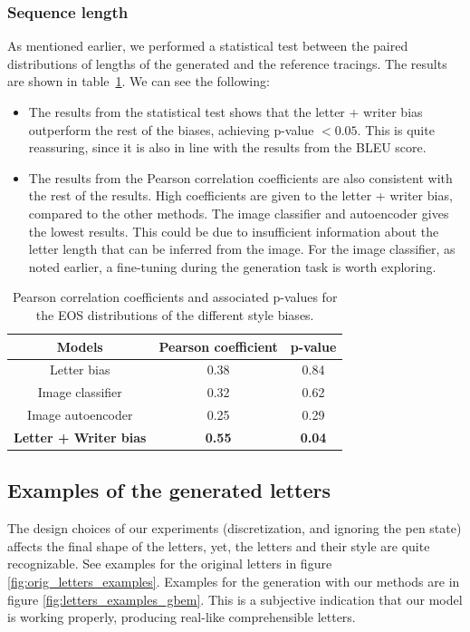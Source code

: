 \subsubsection{Sequence length}
\par As mentioned earlier, we performed a statistical test between the paired distributions of lengths of the generated and the reference tracings. The results are shown in table~\ref{table:2}. We can see the following:
\begin{itemize}
    \item The results from the statistical test shows that the letter + writer bias outperform the rest of the biases, achieving p-value $< 0.05$. This is quite reassuring, since it is also in line with the results from the BLEU score.
    \item The results from the Pearson correlation coefficients are also consistent with the rest of the results. High coefficients are given to the letter + writer bias, compared to the other methods. The image classifier and autoencoder gives the lowest results. This could be due to insufficient information about the letter length that can be inferred from the image. For the image classifier, as noted earlier, a fine-tuning during the generation task is worth exploring.
\end{itemize}

\begin{table}[!htbp]
\centering
\begin{tabular}{|c|c|c|}
\hline
Models & Pearson coefficient & p-value \\ \hline
Letter bias & 0.38 & 0.84 \\ \hline
Image classifier & 0.32 & 0.62\\ \hline
Image autoencoder & 0.25 & 0.29 \\ \hline
\textbf{Letter + Writer bias} & \textbf{0.55} & \textbf{0.04}\\ \hline
\end{tabular}
\caption{Pearson correlation coefficients and associated p-values for the EOS distributions of the different style biases.}

\label{table:2}
\end{table}

\subsection{Examples of the generated letters}
\par The design choices of our experiments (discretization, and ignoring the pen state) affects the final shape of the letters, yet, the letters and their style are quite recognizable. See examples for the original letters in figure \ref{fig:orig_letters_examples}. Examples for the generation with our methods are in figure \ref{fig:letters_examples_gbem}. This is a subjective indication that our model is working properly, producing real-like comprehensible letters.

